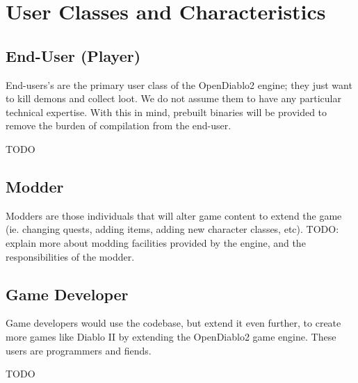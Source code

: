 \section{User Classes and Characteristics} \label{sec:user_classes}


\subsection{End-User (Player)}
End-users's are the primary user class of the OpenDiablo2 engine; they just want
to kill demons and collect loot. We do not assume them to have any particular
technical expertise. With this in mind,  prebuilt binaries will be provided to 
remove the burden of compilation from the end-user.

TODO

\subsection{Modder}
Modders are those individuals that will alter game content to extend the game
(ie. changing quests, adding items, adding new character classes, etc).
TODO: explain more about modding facilities provided by the engine, and the
responsibilities of the modder.

\subsection{Game Developer}
Game developers would use the codebase, but extend it even further, to create
more games like Diablo II by extending the OpenDiablo2 game engine. These users
are programmers and fiends.

TODO

